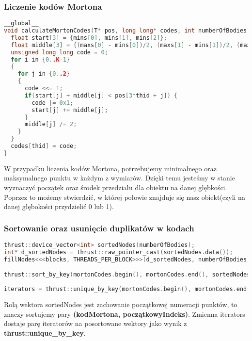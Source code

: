 \documentclass[14pt,twoside,a4paper]{article}
\theoremstyle{definition}
\begin{document}
\subsubsection{\large Liczenie kodów Mortona}
\begin{lstlisting}[language=C++, frame=single, framerule=2pt, caption=Krok 1]
__global__
void calculateMortonCodes(T* pos, long long* codes, int numberOfBodies, T* mins, T* maxs) {
  float start[3] = {mins[0], mins[1], mins[2]};
  float middle[3] = {(maxs[0] - mins[0])/2, (maxs[1] - mins[1])/2, (maxs[2] - mins[2])/2};
  unsigned long long code = 0;
  for i in {0..K-1} 
  {
  	for j in {0..2}
    {
      code <<= 1;
      if(start[j] + middle[j] < pos[3*thid + j]) {
        code |= 0x1;
        start[j] += middle[j];
      }
      middle[j] /= 2;
    }
  }
  codes[thid] = code;
}
\end{lstlisting}
W przypadku liczenia kodów Mortona, potrzebujemy minimalnego oraz maksymalnego punktu w każdym z wymiarów. Dzięki temu jesteśmy w stanie wyznaczyć początek oraz środek przedziału dla obiektu na danej głębkości. Poprzez to możemy stwierdzić, w której połowie znajduje się nasz obiekt(czyli na danej głębokości przydzielić 0 lub 1).
\subsubsection{\large Sortowanie oraz usunięcie duplikatów w kodach}

\begin{lstlisting}[language=C++, frame=single, framerule=2pt, caption=Kroki 2-4]
thrust::device_vector<int> sortedNodes(numberOfBodies);
int* d_sortedNodes = thrust::raw_pointer_cast(sortedNodes.data());
fillNodes<<<blocks, THREADS_PER_BLOCK>>>(d_sortedNodes, numberOfBodies);

thrust::sort_by_key(mortonCodes.begin(), mortonCodes.end(), sortedNodes.begin());  
  
iterators = thrust::unique_by_key(mortonCodes.begin(), mortonCodes.end(), sortedNodes.begin());
\end{lstlisting}

Rolą wektora sortedNodes jest zachowanie początkowej numeracji punktów, to znaczy sortujemy pary \textbf{(kodMortona, początkowyIndeks)}.
Zmienna iterators dostaje parę iteratorów na posortowane wektory jako wynik z \textbf{thrust::unique\_by\_key}.
\end{document}
